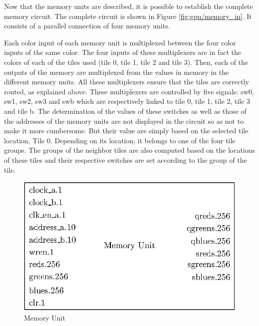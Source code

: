 Now that the memory units are described, it is possible to establish the complete memory circuit.
The complete circuit is shown in Figure \ref{fig:gpu/memory_in}. It consists of a parallel 
connection of four memory units. 

Each color input of each memory unit is multiplexed between the four color inputs of the same color. 
The four inputs of these multiplexers are in fact the colors of each of the 
tiles used (tile 0, tile 1, tile 2 and tile 3). Then, each of the outputs of the memory are 
multiplexed from the values in memory in the different memory units. All these multiplexers ensure 
that the tiles are correctly routed, as explained above. These multiplexers are controlled by five 
signals: sw0, sw1, sw2, sw3 and swb which are respectively linked to tile 0, tile 1, tile 2, tile 3 
and tile b. The determination of the values of these switches as well as those of the addresses of 
the memory units are not displayed in the circuit so as not to make it more cumbersome. But their
value are simply based on the selected tile location, Tile 0. Depending on its location, it belongs 
to one of the four tile groups. The groups of the neighbor tiles are also computed based on the 
locations of these tiles and their respective switches are set according to the group of the tile. 

\begin{figure}[H]
    \centering
    \includegraphics[scale=1.0]{Chapter4-GPU_CLKU/res/memory_unit}
    \caption{Memory Unit}
    \label{fig:gpu/memory_unit}
\end{figure}

